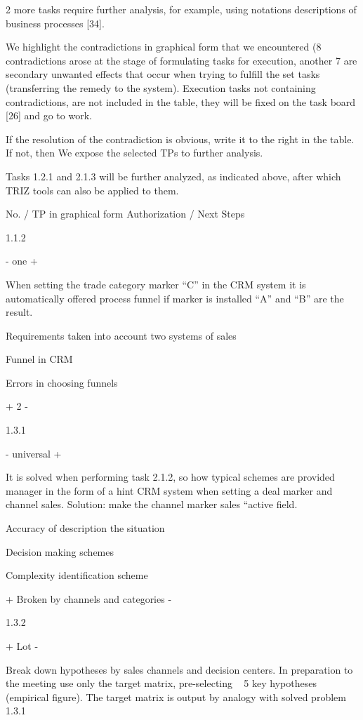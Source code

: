 \documentclass[11pt,a4paper]{book}
\begin{document}
2 more tasks require further analysis, for example, using notations
descriptions of business processes [34].

We highlight the contradictions in graphical form that we encountered (8
contradictions arose at the stage of formulating tasks for execution, another
7 are secondary unwanted effects that occur when trying to fulfill the set
tasks (transferring the remedy to the system). Execution tasks not containing
contradictions, are not included in the table, they will be fixed on the task
board [26] and go to work.

If the resolution of the contradiction is obvious, write it to the right in
the table. If not, then We expose the selected TPs to further analysis.

Tasks 1.2.1 and 2.1.3 will be further analyzed, as indicated above, after
which TRIZ tools can also be applied to them.


No. / TP in graphical form Authorization / Next Steps

1.1.2

- one +

When setting the trade category marker “C” in the CRM system it is
automatically offered process funnel if marker is installed “A” and “B” are
the result.

Requirements taken into account two systems of sales

Funnel in CRM

Errors in choosing funnels

+ 2 -

1.3.1

- universal +

It is solved when performing task 2.1.2, so how typical schemes are provided
manager in the form of a hint CRM system when setting a deal marker and
channel sales. Solution: make the channel marker sales “active field.

Accuracy of description the situation

Decision making schemes

Complexity identification scheme

+ Broken by channels and categories -

1.3.2

+ Lot -

Break down hypotheses by sales channels and decision centers. In preparation
to the meeting use only the target matrix, pre-selecting ~ 5 key hypotheses
(empirical figure).  The target matrix is output by analogy with solved
problem 1.3.1
\end{document}
